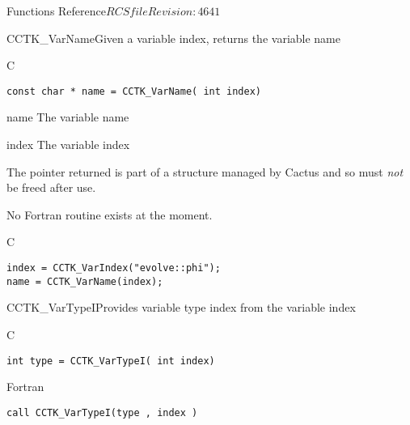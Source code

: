 \begin{cactuspart}{ Functions Reference}{$RCSfile$}{$Revision: 4641 $}
\begin{FunctionDescription}{CCTK\_VarName}{Given a variable index, returns the variable name}
\label{CCTK-VarName}
\begin{SynopsisSection}
\begin{Synopsis}{C}
\begin{verbatim}const char * name = CCTK_VarName( int index)\end{verbatim}
\end{Synopsis}
\end{SynopsisSection}
\begin{ParameterSection}
\begin{Parameter}{name}
The variable name
\end{Parameter}
\begin{Parameter}{index}
The variable index
\end{Parameter}
\end{ParameterSection}
\begin{Discussion}
The pointer returned is part of a structure managed by Cactus
and so must {\em not} be freed after use.

No Fortran routine exists at the moment.
\end{Discussion}
\begin{ExampleSection}
\begin{Example}{C}
\begin{verbatim}
index = CCTK_VarIndex("evolve::phi");
name = CCTK_VarName(index);
\end{verbatim}
\end{Example}
\end{ExampleSection}
\end{FunctionDescription}


\begin{FunctionDescription}{CCTK\_VarTypeI}{Provides variable type index from the variable index}
\label{CCTK-VarTypeI}
\begin{SynopsisSection}
\begin{Synopsis}{C}
\begin{verbatim}int type = CCTK_VarTypeI( int index)\end{verbatim}
\end{Synopsis}
\begin{Synopsis}{Fortran}
\begin{verbatim}call CCTK_VarTypeI(type , index )


\end{verbatim}
\end{Synopsis}
\end{SynopsisSection}
\end{FunctionDescription}
\end{cactuspart}
